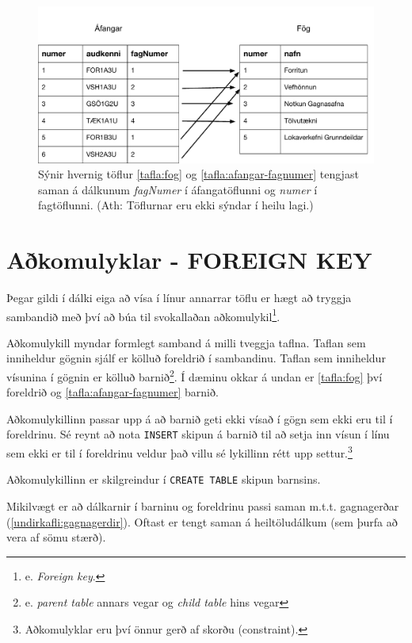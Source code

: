 \begin{figure}
\caption[Tengsl taflna]{Sýnir hvernig töflur \ref{tafla:fog} og \ref{tafla:afangar-fagnumer} tengjast saman á dálkunum \emph{fagNumer} í áfangatöflunni og \emph{numer} í fagtöflunni. (Ath: Töflurnar eru ekki sýndar í heilu lagi.)}
\label{mynd:tengsl}
\centering
\includegraphics[width=\linewidth]{myndir/foreign-key}
\end{figure}

\section{Aðkomulyklar - FOREIGN KEY}
\label{undirkafli:adkomulyklar}
Þegar gildi í dálki eiga að vísa í línur annarrar töflu er hægt að tryggja sambandið með því að búa til svokallaðan aðkomulykil\footnote{e. \emph{Foreign key}.}.

Aðkomulykill myndar formlegt samband á milli tveggja taflna. Taflan sem inniheldur gögnin sjálf er kölluð foreldrið í sambandinu. Taflan sem inniheldur vísunina í gögnin er kölluð barnið\footnote{e. \emph{parent table} annars vegar og \emph{child table} hins vegar}. Í dæminu okkar á undan er \ref{tafla:fog} því foreldrið og \ref{tafla:afangar-fagnumer} barnið.

Aðkomulykillinn passar upp á að barnið geti ekki vísað í gögn sem ekki eru til í foreldrinu. Sé reynt að nota \verb|INSERT| skipun á barnið til að setja inn vísun í línu sem ekki er til í foreldrinu veldur það villu sé lykillinn rétt upp settur.\footnote{Aðkomulyklar eru því önnur gerð af skorðu (constraint).}

Aðkomulykillinn er skilgreindur í \verb|CREATE TABLE| skipun barnsins.

Mikilvægt er að dálkarnir í barninu og foreldrinu passi saman m.t.t. gagnagerðar (\ref{undirkafli:gagnagerdir}). Oftast er tengt saman á heiltöludálkum (sem þurfa að vera af sömu stærð).

